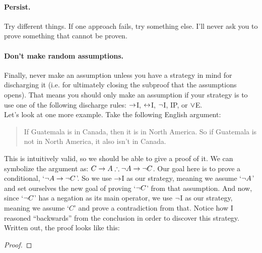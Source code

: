 \paragraph{Persist.}
Try different things. If one approach fails, try something else.  I'll never ask you to prove something that cannot be proven.

\paragraph{Don't make random assumptions.} Finally, never make an assumption unless you have a strategy in mind for discharging it (i.e. for ultimately closing the subproof that the assumptions opens).  That means you should only make an assumption if your strategy is to use one of the following discharge rules: $\rightarrow$I, $\leftrightarrow$I, $\neg$I, IP, or $\vee$E.\\


Let's look at one more example.  Take the following English argument:
\begin{quote}
If Guatemala is in Canada, then it is in North America. So if Guatemala is not in North America, it also isn't in Canada.
\end{quote}
This is intuitively valid, so we should be able to give a proof of it.  We can symbolize the argument as: $C \rightarrow A \therefore \neg A \rightarrow \neg C$.	Our goal here is to prove a conditional, `$\neg A \rightarrow \neg C$'.  So we use $\rightarrow$I as our strategy, meaning we assume `$\neg A$' and set ourselves the new goal of proving `$\neg C$' from that assumption.  And now, since `$\neg C$' has a negation as its main operator, we use $\neg$I as our strategy, meaning we assume `$C$' and prove a contradiction from that.  Notice how I reasoned ``backwards'' from the conclusion in order to discover this strategy.  Written out, the proof looks like this:


\begin{proof}
  
\open
	 
	\open
		 
		 
		 
	\close
	 
\close
{} 
\end{proof}



